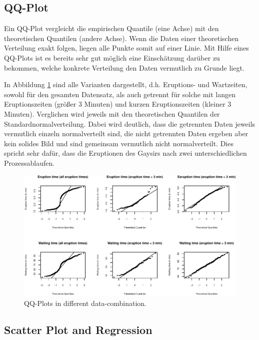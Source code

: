 \documentclass[10pt,]{article}
\begin{document}
\subsection{QQ-Plot}\label{qq-plot}

Ein QQ-Plot vergleicht die empirischen Quantile (eine Achse) mit den
theoretischen Quantilen (andere Achse). Wenn die Daten einer
theoretischen Verteilung exakt folgen, liegen alle Punkte somit auf
einer Linie. Mit Hilfe eines QQ-Plots ist es bereits sehr gut möglich
eine Einschätzung darüber zu bekommen, welche konkrete Verteilung den
Daten vermutlich zu Grunde liegt.

In Abbildung \ref{fig:qq} sind alle Varianten dargestellt, d.h.
Eruptions- und Wartzeiten, sowohl für den gesamten Datensatz, als auch
getrennt für solche mit langen Eruptionszeiten (größer 3 Minuten) und
kurzen Eruptionszeiten (kleiner 3 Minuten). Verglichen wird jeweils mit
den theoretischen Quantilen der Standardnormalverteilung. Dabei wird
deutlich, dass die getrennten Daten jeweils vermutlich einzeln
normalverteilt sind, die nicht getrennten Daten ergeben aber kein
solides Bild und sind gemeinsam vermutlich nicht normalverteilt. Dies
spricht sehr dafür, dass die Eruptionen des Gaysirs nach zwei
unterschiedlichen Prozessablaufen.

\begin{figure}[htbp]
\centering
\includegraphics{project1_files/figure-latex/qq-plots-1.pdf}
\caption{QQ-Plots in different data-combination.\label{fig:qq}}
\end{figure}

\subsection{Scatter Plot and
Regression}\label{scatter-plot-and-regression}
\end{document}

